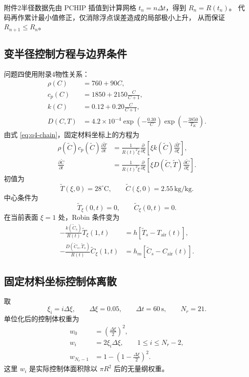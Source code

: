 \documentclass[UTF8,a4paper,11pt]{ctexart}
\numberwithin{equation}{section}
\begin{document}
附件2半径数据先由 PCHIP 插值到计算网格
\(t_n=n\Delta t\)，得到 \(R_n=R(t_n)\)。
代码再作累计最小值修正，仅消除浮点误差造成的局部极小上升，
从而保证 \(R_{n+1}\le R_n\)。

\subsection{变半径控制方程与边界条件}

问题四使用附录4物性关系：
\begin{align}
\rho(C)&=760+90C, \label{eq:q4-rho}\\
c_p(C)&=1850+2150\frac{C}{C+1}, \label{eq:q4-cp}\\
k(C)&=0.12+0.20\frac{C}{C+1}, \label{eq:q4-k}\\
D(C,T)&=4.2\times10^{-4}\exp\left(-\frac{0.30}{C}\right)
\exp\left(-\frac{3850}{T_K}\right). \label{eq:q4-D}
\end{align}
由式 \eqref{eq:q4-chain}，固定材料坐标上的方程为
\begin{align}
\rho(\widetilde C)c_p(\widetilde C)
\frac{\partial\widetilde T}{\partial t}
&=\frac{1}{R(t)^2\xi}\frac{\partial}{\partial\xi}
\left[\xi k(\widetilde C)
\frac{\partial\widetilde T}{\partial\xi}\right], \label{eq:q4-T}\\
\frac{\partial\widetilde C}{\partial t}
&=\frac{1}{R(t)^2\xi}\frac{\partial}{\partial\xi}
\left[\xi D(\widetilde C,\widetilde T)
\frac{\partial\widetilde C}{\partial\xi}\right]. \label{eq:q4-C}
\end{align}
初值为
\[
\widetilde T(\xi,0)=28^\circ\mathrm{C},\qquad
\widetilde C(\xi,0)=2.55\,\mathrm{kg/kg}.
\]
中心条件为
\[
\widetilde T_\xi(0,t)=0,\qquad
\widetilde C_\xi(0,t)=0.
\]
在当前表面 \(\xi=1\) 处，Robin 条件变为
\begin{align}
-\frac{k(\widetilde C_s)}{R(t)}
\widetilde T_\xi(1,t)
&=h[\widetilde T_s-T_{\mathrm{air}}(t)], \label{eq:q4-bc-T}\\
-\frac{D(\widetilde C_s,\widetilde T_s)}{R(t)}
\widetilde C_\xi(1,t)
&=h_m[\widetilde C_s-C_{\mathrm{air}}(t)]. \label{eq:q4-bc-C}
\end{align}

\subsection{固定材料坐标控制体离散}

取
\[
\xi_i=i\Delta\xi,\qquad
\Delta\xi=0.05,\qquad
\Delta t=60\,\mathrm{s},\qquad
N_r=21.
\]
单位化后的控制体权重为
\begin{align}
w_0&=\left(\frac{\Delta\xi}{2}\right)^2,\\
w_i&=2\xi_i\Delta\xi,\qquad 1\le i\le N_r-2,\\
w_{N_r-1}&=1-\left(1-\frac{\Delta\xi}{2}\right)^2.
\end{align}
这里 \(w_i\) 是实际控制体面积除以 \(\pi R^2\) 后的无量纲权重。
\end{document}
